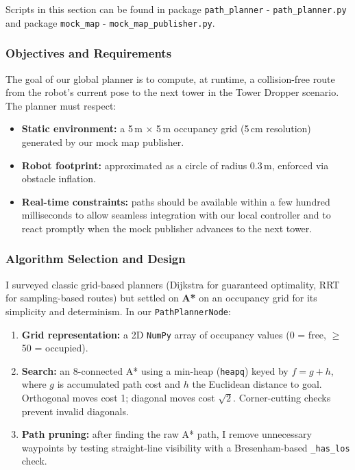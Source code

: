 Scripts in this section can be found in package \texttt{path\_planner} - \texttt{path\_planner.py} and package \texttt{mock\_map} - \texttt{mock\_map\_publisher.py}.

\subsubsection{Objectives and Requirements}
The goal of our global planner is to compute, at runtime, a collision-free route from the robot’s current pose to the next tower in the Tower Dropper scenario. The planner must respect:
\begin{itemize}
  \item \textbf{Static environment:} a 5\,m × 5\,m occupancy grid (5\,cm resolution) generated by our mock map publisher.
  \item \textbf{Robot footprint:} approximated as a circle of radius 0.3\,m, enforced via obstacle inflation.
  \item \textbf{Real-time constraints:} paths should be available within a few hundred milliseconds to allow seamless integration with our local controller and to react promptly when the mock publisher advances to the next tower.
\end{itemize}

\subsubsection{Algorithm Selection and Design}
I surveyed classic grid-based planners (Dijkstra for guaranteed optimality, RRT for sampling-based routes) but settled on \textbf{A*} on an occupancy grid for its simplicity and determinism. In our \texttt{PathPlannerNode}:
\begin{enumerate}
  \item \textbf{Grid representation:} a 2D \texttt{NumPy} array of occupancy values (0 = free, $\geq$50 = occupied).
  \item \textbf{Search:} an 8-connected A* using a min-heap (\texttt{heapq}) keyed by $f = g + h$, where $g$ is accumulated path cost and $h$ the Euclidean distance to goal. Orthogonal moves cost 1; diagonal moves cost $\sqrt{2}$. Corner-cutting checks prevent invalid diagonals.
  \item \textbf{Path pruning:} after finding the raw A* path, I remove unnecessary waypoints by testing straight-line visibility with a Bresenham-based \texttt{\_has\_los} check.
\end{enumerate}

